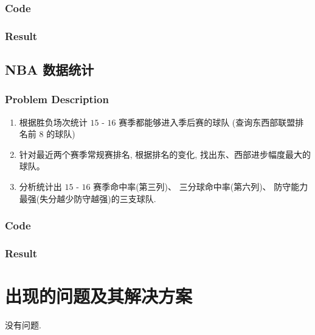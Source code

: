 \documentclass{article}
\begin{document}
\subsubsection{Code}
\subsubsection{Result}

\subsection{NBA 数据统计}
\subsubsection{Problem Description}
\begin{enumerate}
  \item 根据胜负场次统计 $ 15 $ - $ 16 $ 赛季都能够进入季后赛的球队
    (查询东西部联盟排名前 $ 8 $ 的球队)
  \item 针对最近两个赛季常规赛排名, 根据排名的变化, 找出东、西部进步幅度最大的球队。
  \item 分析统计出 $ 15 $ - $ 16 $ 赛季命中率(第三列)、 三分球命中率(第六列)、
    防守能力最强(失分越少防守越强)的三支球队.
\end{enumerate}

\subsubsection{Code}
\subsubsection{Result}

\section{出现的问题及其解决方案}
没有问题.
\end{document}
